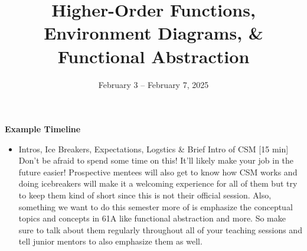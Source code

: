 \documentclass{exam}
\title{Higher-Order Functions, Environment Diagrams, \& Functional Abstraction}
\date{February 3 -- February 7, 2025}
\begin{document}
\maketitle

\begin{meta}
    \textbf{Example Timeline}
    \begin{itemize}
        \item Intros, Ice Breakers, Expectations, Logstics \& Brief Intro of CSM [15 min]
        \subitem Don't be afraid to spend some time on this! It'll likely make your job in the future easier! Prospective mentees will also get to know how CSM works and doing icebreakers will make it a welcoming experience for all of them but try to keep them kind of short since this is not their official session.
        \subitem Also, something we want to do this semester more of is emphasize the conceptual topics and concepts in 61A like functional abstraction and more. So make sure to talk about them regularly throughout all of your teaching sessions and tell junior mentors to also emphasize them as well.
    \end{itemize}
\end{meta} 
\end{document}
